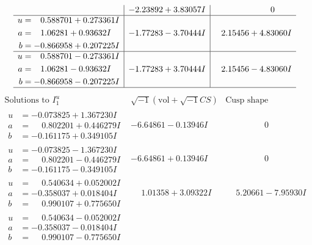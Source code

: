 \documentclass[1p]{elsarticle_modified}
\theoremstyle{definition}
\newcommand{\I}{\sqrt{-1}}
\begin{document}
$$\begin{array}{c|c|c}
 & -2.23892 + 3.83057 I & \phantom{-0.000000 } 0 \\ \hline\begin{aligned}
u &= \phantom{-}0.588701 + 0.273361 I \\
a &= \phantom{-}1.06281 + 0.93632 I \\
b &= -0.866958 + 0.207225 I\end{aligned}
 & -1.77283 - 3.70444 I & \phantom{-}2.15456 + 4.83060 I \\ \hline\begin{aligned}
u &= \phantom{-}0.588701 - 0.273361 I \\
a &= \phantom{-}1.06281 - 0.93632 I \\
b &= -0.866958 - 0.207225 I\end{aligned}
 & -1.77283 + 3.70444 I & \phantom{-}2.15456 - 4.83060 I\\
 \hline 
 \end{array}$$\newpage$$\begin{array}{c|c|c}  
\text{Solutions to }I^u_{1}& \I (\text{vol} + \sqrt{-1}CS) & \text{Cusp shape}\\
 \hline 
\begin{aligned}
u &= -0.073825 + 1.367230 I \\
a &= \phantom{-}0.802201 + 0.446279 I \\
b &= -0.161175 + 0.349105 I\end{aligned}
 & -6.64861 - 0.13946 I & \phantom{-0.000000 } 0 \\ \hline\begin{aligned}
u &= -0.073825 - 1.367230 I \\
a &= \phantom{-}0.802201 - 0.446279 I \\
b &= -0.161175 - 0.349105 I\end{aligned}
 & -6.64861 + 0.13946 I & \phantom{-0.000000 } 0 \\ \hline\begin{aligned}
u &= \phantom{-}0.540634 + 0.052002 I \\
a &= -0.358037 + 0.018404 I \\
b &= \phantom{-}0.990107 + 0.775650 I\end{aligned}
 & \phantom{-}1.01358 + 3.09322 I & \phantom{-}5.20661 - 7.95930 I \\ \hline\begin{aligned}
u &= \phantom{-}0.540634 - 0.052002 I \\
a &= -0.358037 - 0.018404 I \\
b &= \phantom{-}0.990107 - 0.775650 I\end{aligned}

\end{array}$$
\end{document}
